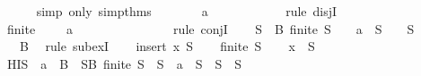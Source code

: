 \begin{isabellebody}
\ \ \ \ \isamarkupfalse%
\ {\isacharparenleft}simp\ only{\isacharcolon}\ simp{\isacharunderscore}thms{\isacharparenleft}{}{\isacharparenright}{\isacharparenright}\isanewline
\ \ \isamarkupfalse%
\ \isamarkupfalse%
\ {}{\isacharcolon}{\isachardoublequoteopen}{\isacharbraceleft}{\isacharbraceright}\ {\isacharequal}\ {\isacharbraceleft}a{\isacharbraceright}\ {\isasymunion}\ {\isacharbraceleft}{\isacharbraceright}\ {\isasymor}\ {\isacharbraceleft}{\isacharbraceright}\ {\isacharequal}\ {\isacharbraceleft}{\isacharbraceright}{\isachardoublequoteclose}\isanewline
\ \ \ \ \isamarkupfalse%
\ {\isacharparenleft}rule\ disjI{}{\isacharparenright}\isanewline
\ \ \isamarkupfalse%
\ {\isachardoublequoteopen}finite\ {\isacharbraceleft}{\isacharbraceright}\ {\isasymand}\ {\isacharparenleft}{\isacharbraceleft}{\isacharbraceright}\ {\isacharequal}\ {\isacharbraceleft}a{\isacharbraceright}\ {\isasymunion}\ {\isacharbraceleft}{\isacharbraceright}\ {\isasymor}\ {\isacharbraceleft}{\isacharbraceright}\ {\isacharequal}\ {\isacharbraceleft}{\isacharbraceright}{\isacharparenright}{\isachardoublequoteclose}\isanewline
\ \ \ \ \isamarkupfalse%
\ {}\ {}\ \isamarkupfalse%
\ {\isacharparenleft}rule\ conjI{\isacharparenright}\isanewline
\ \ \isamarkupfalse%
\ {\isachardoublequoteopen}{\isasymexists}S{\isacharprime}\ {\isasymsubseteq}\ B{\isachardot}\ finite\ S{\isacharprime}\ {\isasymand}\ {\isacharparenleft}{\isacharbraceleft}{\isacharbraceright}\ {\isacharequal}\ {\isacharbraceleft}a{\isacharbraceright}\ {\isasymunion}\ S{\isacharprime}\ {\isasymor}\ {\isacharbraceleft}{\isacharbraceright}\ {\isacharequal}\ S{\isacharprime}{\isacharparenright}{\isachardoublequoteclose}\isanewline
\ \ \ \ \isamarkupfalse%
\ {\isacartoucheopen}{\isacharbraceleft}{\isacharbraceright}\ {\isasymsubseteq}\ B{\isacartoucheclose}\ \isamarkupfalse%
\ {\isacharparenleft}rule\ subexI{\isacharparenright}\isanewline
{}\isamarkupfalse%
\isanewline
\ \ \isamarkupfalse%
\ {\isacharparenleft}insert\ x\ S{\isacharparenright}\isanewline
\ \ \isamarkupfalse%
\ {\isachardoublequoteopen}finite\ S{\isachardoublequoteclose}\isanewline
\ \ \isamarkupfalse%
\ {\isachardoublequoteopen}x\ {\isasymnotin}\ S{\isachardoublequoteclose}\isanewline
\ \ \isamarkupfalse%
\ HI{\isacharcolon}{\isachardoublequoteopen}S\ {\isasymsubseteq}\ {\isacharbraceleft}a{\isacharbraceright}\ {\isasymunion}\ B\ {\isasymLongrightarrow}\ {\isasymexists}S{\isacharprime}{\isasymsubseteq}B{\isachardot}\ finite\ S{\isacharprime}\ {\isasymand}\ {\isacharparenleft}S\ {\isacharequal}\ {\isacharbraceleft}a{\isacharbraceright}\ {\isasymunion}\ S{\isacharprime}\ {\isasymor}\ S\ {\isacharequal}\ S{\isacharprime}{\isacharparenright}{\isachardoublequoteclose}\isanewline

\end{isabellebody}
